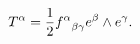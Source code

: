 \begin{equation}{T^\alpha}={1\over 2}{f^\alpha}_{\beta\gamma}e^\beta\wedge e^\gamma.\end{equation}

